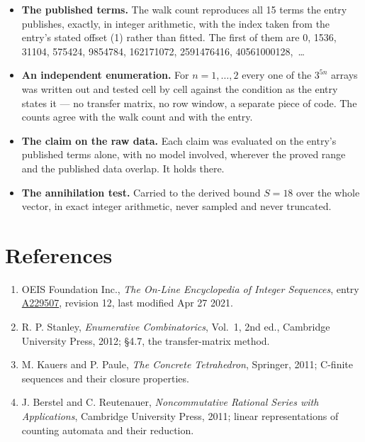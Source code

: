 \documentclass[11pt]{article}
\theoremstyle{definition}
\begin{document}
\begin{itemize}

\item {\bfseries The published terms.} The walk count reproduces all 15 terms the entry publishes, exactly, in integer arithmetic, with the index taken from the entry's stated offset (1) rather than fitted. The first of them are 0, 1536, 31104, 575424, 9854784, 162171072, 2591476416, 40561000128,~\dots

\item {\bfseries An independent enumeration.} For $n = 1,\dots,2$ every one of the $3^{5n}$ arrays was written out and tested cell by cell against the condition as the entry states it --- no transfer matrix, no row window, a separate piece of code. The counts agree with the walk count and with the entry.

\item {\bfseries The claim on the raw data.} Each claim was evaluated on the entry's published terms alone, with no model involved, wherever the proved range and the published data overlap. It holds there.

\item {\bfseries The annihilation test.} Carried to the derived bound $S = 18$ over the whole vector, in exact integer arithmetic, never sampled and never truncated.

\end{itemize}

\section{References}

\begin{enumerate}

\item OEIS Foundation Inc., \emph{The On-Line Encyclopedia of Integer Sequences}, entry \href{https://oeis.org/A229507}{A229507}, revision 12, last modified Apr 27 2021.

\item R. P. Stanley, \emph{Enumerative Combinatorics}, Vol.~1, 2nd ed., Cambridge University Press, 2012; \S4.7, the transfer-matrix method.

\item M. Kauers and P. Paule, \emph{The Concrete Tetrahedron}, Springer, 2011; C-finite sequences and their closure properties.

\item J. Berstel and C. Reutenauer, \emph{Noncommutative Rational Series with Applications}, Cambridge University Press, 2011; linear representations of counting automata and their reduction.

\end{enumerate}
\end{document}
